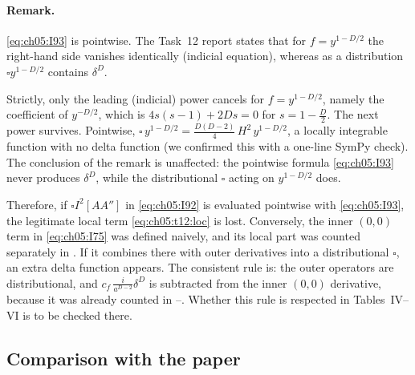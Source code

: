\paragraph{Remark.} \eqref{eq:ch05:I93} is pointwise.
The Task~12 report states that for $f=y^{1-D/2}$ the right-hand side vanishes identically (indicial equation), whereas as a distribution $\square y^{1-D/2}$ contains $\delta^D$.
\begin{notebox}
Strictly, only the leading (indicial) power cancels for $f=y^{1-D/2}$, namely the coefficient of $y^{-D/2}$, which is $4s(s-1)+2Ds=0$ for $s=1-\frac D2$.
The next power survives. Pointwise,
$\square\,y^{1-D/2}=\tfrac{D(D-2)}{4}\,H^2\,y^{1-D/2}$, a locally integrable function with no delta function (we confirmed this with a one-line SymPy check).
The conclusion of the remark is unaffected: the pointwise formula \eqref{eq:ch05:I93} never produces $\delta^D$, while the distributional $\square$ acting on $y^{1-D/2}$ does.
\end{notebox}
\noindent Therefore, if $\square I^2[AA'']$ in \eqref{eq:ch05:I92} is evaluated pointwise with \eqref{eq:ch05:I93}, the legitimate local term \eqref{eq:ch05:t12:loc} is lost.
Conversely, the inner $(0,0)$ term in \eqref{eq:ch05:I75} was defined naively, and its local part was counted separately in .
If it combines there with outer derivatives into a distributional $\square$, an extra delta function appears.
The consistent rule is: the outer operators are distributional, and $c_f\,\frac{i}{a^{D-2}}\delta^D$ is subtracted from the inner $(0,0)$ derivative, because it was already counted in --.
Whether this rule is respected in Tables~IV--VI is to be checked there.

\subsection{Comparison with the paper}
\label{sec:ch05:t12:comp}

